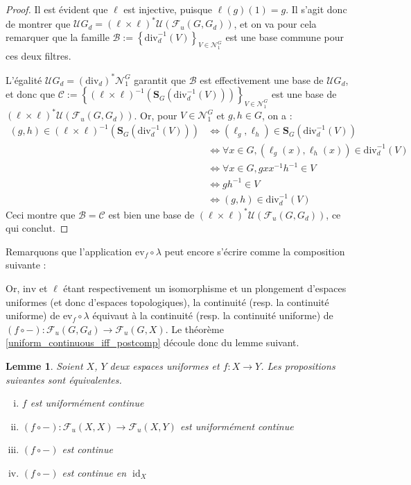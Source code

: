 \documentclass[a4paper,12pt]{article}
\newtheorem{lemma}[theorem]{Lemme}
\newcommand{\ev}{\mathrm{ev}}
\newcommand{\set}[1]{\left\{ #1 \right\}}
\newcommand{\inv}{^{-1}}
\newcommand{\comp}{\circ}
\newcommand{\nhds}{\mathcal{N}}
\renewcommand{\iff}{\Leftrightarrow}
\newcommand{\blank}{{-}}
\newcommand{\invop}{\mathrm{inv}}
\newcommand{\divop}{\mathrm{div}}
\DeclareMathOperator{\id}{id}
\begin{document}
\begin{proof}
    Il est évident que $\ell$ est injective, puisque $\ell(g)(1)=g$. Il s'agit
    donc de montrer que $\mathcal{U}G_d = (\ell\times\ell)^*\mathcal{U}(\mathcal{F}_u(G, G_d))$,
    et on va pour cela remarquer que la famille $\mathcal{B}:=\set{\divop_d\inv(V)}_{V\in\nhds_1^G}$ est une base commune pour ces deux filtres.

    L'égalité $\mathcal{U}G_d=(\divop_d)^*\nhds_1^G$ garantit que $\mathcal{B}$ est effectivement une base de $\mathcal{U}G_d$,
    et donc que $\mathcal{C}:=\set{(\ell\times\ell)\inv\left(\mathbf{S}_G(\divop_d\inv(V))\right)}_{V\in\nhds_1^G}$ est une base de $(\ell\times\ell)^*\mathcal{U}(\mathcal{F}_u(G, G_d))$.
    Or, pour $V\in\nhds_1^G$ et $g, h\in G$, on a :
    \begin{align*}
        (g, h)\in(\ell\times\ell)\inv\left(\mathbf{S}_G(\divop_d\inv(V))\right) 
            &\iff (\ell_g,\ell_h)\in \mathbf{S}_G(\divop_d\inv(V)) \\
            &\iff \forall x\in G, (\ell_g(x),\ell_h(x))\in\divop_d\inv(V) \\
            &\iff \forall x\in G, g x x\inv h\inv \in V \\
            &\iff g h\inv \in V \\
            &\iff (g, h) \in\divop_d\inv(V)
    \end{align*}
    Ceci montre que $\mathcal{B}=\mathcal{C}$ est bien une base de $(\ell\times\ell)^*\mathcal{U}(\mathcal{F}_u(G, G_d))$, ce qui conclut.
\end{proof}

Remarquons que l'application $\ev_f\comp\lambda$ peut encore s'écrire comme la composition suivante :
\begin{center}
\end{center}
Or, $\invop$ et $\ell$ étant respectivement un isomorphisme et un plongement d'espaces uniformes (et donc d'espaces topologiques), 
la continuité (resp. la continuité uniforme) de $\ev_f\comp\lambda$ équivaut à la continuité (resp. la continuité uniforme) de 
$(f\comp\blank):\mathcal{F}_u(G, G_d)\to\mathcal{F}_u(G, X)$. Le théorème \ref{uniform_continuous_iff_postcomp} découle donc 
du lemme suivant. 

\begin{lemma}
    Soient $X$, $Y$ deux espaces uniformes et $f:X\to Y$. Les propositions suivantes sont équivalentes.
    \begin{enumerate}[(i)]
        \item $f$ est uniformément continue
        \item $(f\comp\blank) : \mathcal{F}_u(X, X)\to\mathcal{F}_u(X, Y)$ est uniformément continue
        \item $(f\comp\blank)$ est continue
        \item $(f\comp\blank)$ est continue en $\id_X$
    \end{enumerate}
\end{lemma}
\end{document}
